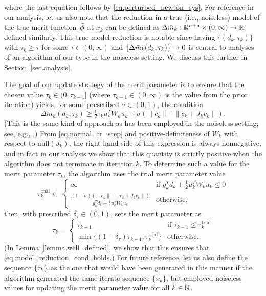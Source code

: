 where the last equation follows by \eqref{eq.perturbed_newton_sys}.  For reference in our analysis, let us also note that the reduction in a true (i.e., noiseless) model of the true merit function~${\bar \phi}$ at $x_k$ can be defined as $\Delta {\bar m}_k : \mathbb{R}^{n+q} \times (0,\infty) \to \mathbb{R}$ defined similarly.  This true model reduction is notable since having $\{(d_k,\tau_k)\}$ with $\tau_k \geq \tau$ for some $\tau \in (0,\infty)$ and $\{\Delta {\bar m}_k(d_k,\tau_k)\} \to 0$ is central to analyses of an algorithm of our type in the noiseless setting.  We discuss this further in Section~\ref{sec.analysis}.

The goal of our update strategy of the merit parameter is to ensure that the chosen value $\tau_k \in (0,\tau_{k-1}]$ (where $\tau_{k-1} \in (0,\infty)$ is the value from the prior iteration) yields, for some prescribed $\sigma \in (0,1)$, the condition
\begin{equation}\label{eq.model_reduction_cond}
  \Delta m_k(d_k,\tau_k) \geq \tfrac12 \tau_k  u_k^T W_k u_k + \sigma (\|c_k\| - \|c_k + J_k v_k\|).
\end{equation}
(This is the same kind of approach as has been employed in the noiseless setting; see, e.g., \cite{CurtScheWaec10}.)  From \eqref{eq.normal_tr_step} and positive-definiteness of $W_k$ with respect to $\mathrm{null}(J_k)$, the right-hand side of this expression is always nonnegative, and in fact in our analysis we show that this quantity is strictly positive when the algorithm does not terminate in iteration $k$.  To determine such a value for the merit parameter $\tau_k$, the algorithm uses the trial merit parameter value
\begin{equation}\label{eq.pi_trial}
  \tau_k^{\text{trial}} \gets \begin{cases} \infty & \text{if $g_k^T d_k + \tfrac12 u_k^T W_k u_k \leq 0$} \\ \frac{(1 - \sigma)(\|c_k \| - \|c_k + J_k v_k \|)}{g_k^T d_k +  \tfrac12 u_k^T W_k u_k} & \text{otherwise}, \end{cases} 
\end{equation}
then, with prescribed $\delta_{\tau} \in (0,1)$, sets the merit parameter as
\begin{equation}\label{eq.tau}
  \tau_k = \begin{cases} \tau_{k-1} & \text{if $\tau_{k-1} \leq \tau_k^{\text{trial}}$} \\ \min\{(1-\delta_{\tau}) \tau_{k-1}, \tau_k^{\text{trial}}\} & \text{otherwise}. \end{cases}
\end{equation}
(In Lemma~\ref{lemma.well_defined}, we show that this ensures that \eqref{eq.model_reduction_cond} holds.)  For future reference, let us also define the sequence $\{{\bar \tau}_k\}$ as the one that would have been generated in this manner if the algorithm generated the same iterate sequence $\{x_k\}$, but employed noiseless values for updating the merit parameter value for all $k \in \mathbb{N}$.

